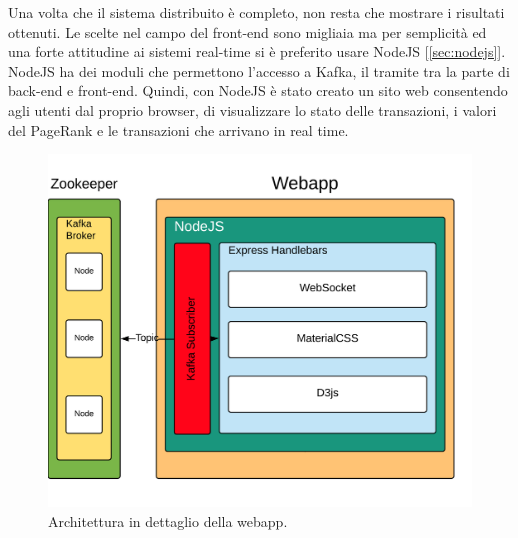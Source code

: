 Una volta che il sistema distribuito è completo, non resta che mostrare i risultati ottenuti. Le scelte nel campo del front-end sono migliaia ma per semplicità ed una forte attitudine ai sistemi real-time si è preferito usare NodeJS [\ref{sec:nodejs}]. NodeJS ha dei moduli che permettono l'accesso a Kafka, il tramite tra la parte di back-end e front-end. Quindi, con NodeJS è stato creato un sito web consentendo agli utenti dal proprio browser, di visualizzare lo stato delle transazioni, i valori del PageRank e le transazioni che arrivano in real time.
\begin{figure}[H]
	\centering
	\includegraphics[width=\textwidth]{images/webApp.png}
	\caption{Architettura in dettaglio della webapp.}
	\label{fig:webAppArchitetture}
\end{figure}






